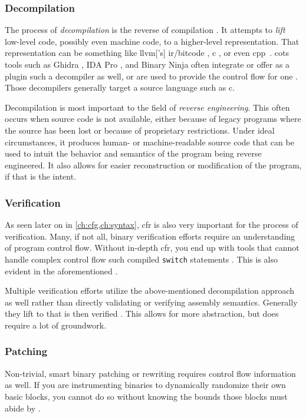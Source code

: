 \subsubsection{Decompilation}
The process of \emph{decompilation} is the reverse of compilation \autocite{cifuentes1994reverse}.
It attempts to \emph{lift} low-level code, possibly even machine code, to a higher-level representation.
That representation can be something like \gls{llvm}['s] \gls{ir}/bitcode \autocite{dinaburg2014mcsema}, \gls{c} \autocite{brumley2013native}, or even \gls{cpp}~\autocite{fokin2011smartdec}.
\Gls{cots} tools such as Ghidra \autocite{ghidra}, IDA Pro \autocite{ida-decompiler}, and Binary Ninja \autocite{binary-ninja-decompiler} often integrate or offer as a plugin such a decompiler as well, or are used to provide the control flow for one \autocite{mcsema}.
Those decompilers generally target a source language such as \gls{c}.

Decompilation is most important to the field of \emph{reverse engineering}.
This often occurs when source code is not available, either because of legacy programs where the source has been lost or because of proprietary restrictions.
Under ideal circumstances, it produces human- or machine-readable source code that can be used to intuit the behavior and semantics of the program being reverse engineered.
It also allows for easier reconstruction or modification of the program, if that is the intent.

\subsubsection{Verification}
As seen later on in \cref{ch:cfg,ch:syntax}, \gls{cfr} is also very important for the process of verification.
Many, if not all, binary verification efforts require an understanding of program control flow.
Without in-depth \gls{cfr}, you end up with tools that cannot handle complex control flow such compiled \lstinline|switch| statements \autocite{myreen2008dil,tan2015auspice}.
This is also evident in the aforementioned .

Multiple verification efforts utilize the above-mentioned decompilation approach as well rather than directly validating or verifying assembly semantics.
Generally they lift to  that is then verified \autocite{myreen2007hoare,myreen2012dil,brumley2011bap}.
This allows for more abstraction, but does require a lot of groundwork.

\subsubsection{Patching}
Non-trivial, smart binary patching or rewriting requires control flow information as well.
If you are instrumenting binaries to dynamically randomize their own basic blocks, you cannot do so without knowing the bounds those blocks must abide by \autocite{wartell2012binary,kim2017revarm}.

